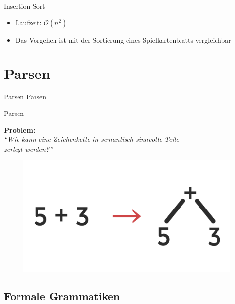 \documentclass[18pt]{beamer}
\newcommand{\quotes}[1]{``#1''}
\begin{document}
\begin{frame}{Insertion Sort}
    \begin{itemize}
        \item Laufzeit: $\mathcal{O}(n^2)$
        \item Das Vorgehen ist mit der Sortierung eines Spielkartenblatts vergleichbar
    \end{itemize}
\end{frame}

\section{Parsen}

\begin{frame}{Parsen}
    \center
    \Huge{Parsen}
\end{frame}

\begin{frame}{Parsen}
    \begin{block}{}
        \textbf{Problem:}\\
        \textit{\quotes{Wie kann eine Zeichenkette in semantisch sinnvolle Teile\\ zerlegt werden?}}
    \end{block}
    \vspace{.2in}
    \begin{figure}
        \includegraphics[scale=.1]{img/syntax-tree-basics.png}
    \end{figure}
\end{frame}

\subsection{Formale Grammatiken}
\end{document}
